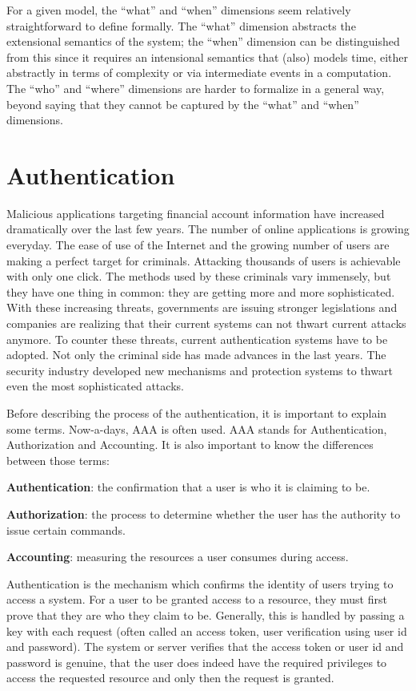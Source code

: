 For a given model, the \enquote{what} and \enquote{when} dimensions seem relatively straightforward to define formally. The \enquote{what} dimension abstracts the extensional semantics
of the system; the \enquote{when} dimension can be distinguished from this since it requires an intensional semantics that (also) models time, either abstractly in terms of complexity
or via intermediate events in a computation. The \enquote{who} and \enquote{where} dimensions are
harder to formalize in a general way, beyond saying that they cannot be captured by the
\enquote{what} and \enquote{when} dimensions.

\section{Authentication}
Malicious applications targeting financial account information have increased dramatically over the last few years. The number of online applications is growing everyday. The ease of use of the Internet and the growing number of users are making a perfect target for criminals. Attacking thousands of users is achievable with only one click. The methods used by these criminals vary immensely, but they have one thing in common: they are getting more and more sophisticated. With these increasing threats, governments are issuing stronger legislations and companies are realizing that their current systems can not thwart current attacks anymore. To counter these threats, current authentication systems have to be adopted. Not only the criminal side has made advances in the last years. The security industry developed new mechanisms and protection systems to thwart even the most sophisticated attacks.

Before describing the process of the authentication, it is important to explain some terms. Now-a-days, AAA is often used. AAA stands for Authentication, Authorization and Accounting. It is also important to know the differences between those terms:
 
\textbf{Authentication}: the confirmation that a user is who it is claiming to be. 

\textbf{Authorization}: the process to determine whether the user has the authority to issue certain commands.
 
\textbf{Accounting}: measuring the resources a user consumes during access.


Authentication is the mechanism which confirms the identity of users trying to access a system. For a user to be granted access to a resource, they must first prove that they are who they claim to be. Generally, this is handled by passing a key with each request (often called an access token, user verification using user id and password). The system or server verifies that the access token or user id and password is genuine, that the user does indeed have the required privileges to access the requested resource and only then the request is granted.

